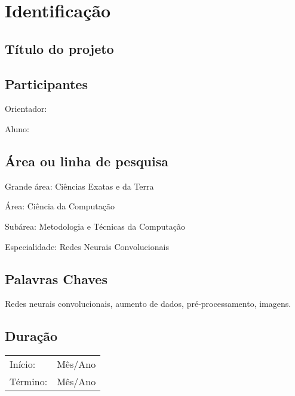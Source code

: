 \section{Identificação}

\subsection{Título do projeto}
    \titulo

\subsection{Participantes}
Orientador: \orientador

Aluno: \nome

\subsection{Área ou linha de pesquisa}
Grande área: Ciências Exatas e da Terra

Área: Ciência da Computação

Subárea: Metodologia e Técnicas da Computação

Especialidade: Redes Neurais Convolucionais

\subsection{Palavras Chaves}
Redes neurais convolucionais, aumento de dados, pré-processamento, imagens.

\subsection{Duração}
\begin{table}[H]
    \begin{tabular}{ll}
        Início: & Mês/Ano\\
        Término: & Mês/Ano\\
    \end{tabular}
\end{table}